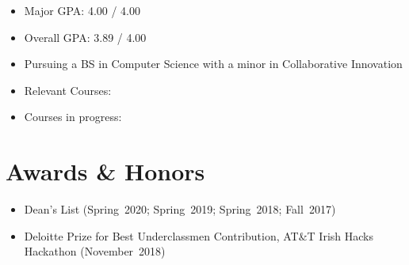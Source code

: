 \documentclass[letterpaper]{article}
\begin{document}
\begin{minipage}[t]{\dimexpr.33\textwidth-.5\columnsep}
\begin{flushleft}
\begin{itemize}
    \item Major GPA: 4.00 / 4.00
    \item Overall GPA: 3.89 / 4.00
    \item Pursuing a BS in Computer Science with a minor in Collaborative Innovation
    \item Relevant Courses:
    \item Courses in progress:
\end{itemize}

\section{Awards \& Honors}
\begin{itemize}
    \item Dean’s List (Spring~2020; Spring~2019; Spring~2018; Fall~2017)
    \item Deloitte Prize for Best Underclassmen Contribution, AT\&T Irish Hacks Hackathon (November~2018)
\end{itemize}


\end{flushleft}
\end{minipage}
\end{document}
